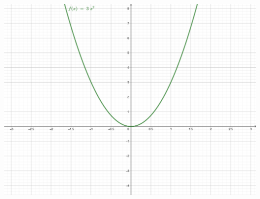 \documentclass[12pt]{article}
\begin{document}
\vspace{\baselineskip}

\section*{}

\vspace{\baselineskip}

\includegraphics[scale=1.5]{"2020 Διαγώνισμα Β Λυκείου Άλγεβρα Συναρτήσεις.png"}
\end{document}
